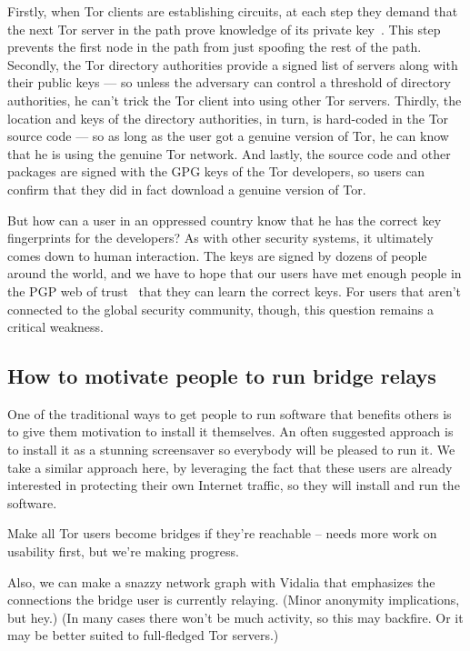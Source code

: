 \documentclass{llncs}
\begin{document}
Firstly, when Tor clients are establishing circuits, at each step
they demand that the next Tor server in the path prove knowledge of
its private key~\cite{tor-design}. This step prevents the first node
in the path from just spoofing the rest of the path. Secondly, the
Tor directory authorities provide a signed list of servers along with
their public keys --- so unless the adversary can control a threshold
of directory authorities, he can't trick the Tor client into using other
Tor servers. Thirdly, the location and keys of the directory authorities,
in turn, is hard-coded in the Tor source code --- so as long as the user
got a genuine version of Tor, he can know that he is using the genuine
Tor network. And lastly, the source code and other packages are signed
with the GPG keys of the Tor developers, so users can confirm that they
did in fact download a genuine version of Tor.

But how can a user in an oppressed country know that he has the correct
key fingerprints for the developers? As with other security systems, it
ultimately comes down to human interaction. The keys are signed by dozens
of people around the world, and we have to hope that our users have met
enough people in the PGP web of trust~\cite{pgp-wot} that they can learn
the correct keys. For users that aren't connected to the global security
community, though, this question remains a critical weakness.


\subsection{How to motivate people to run bridge relays}

One of the traditional ways to get people to run software that benefits
others is to give them motivation to install it themselves.  An often
suggested approach is to install it as a stunning screensaver so everybody
will be pleased to run it. We take a similar approach here, by leveraging
the fact that these users are already interested in protecting their
own Internet traffic, so they will install and run the software.

Make all Tor users become bridges if they're reachable -- needs more work
on usability first, but we're making progress.

Also, we can make a snazzy network graph with Vidalia that emphasizes
the connections the bridge user is currently relaying. (Minor anonymity
implications, but hey.) (In many cases there won't be much activity,
so this may backfire. Or it may be better suited to full-fledged Tor
servers.)
\end{document}
